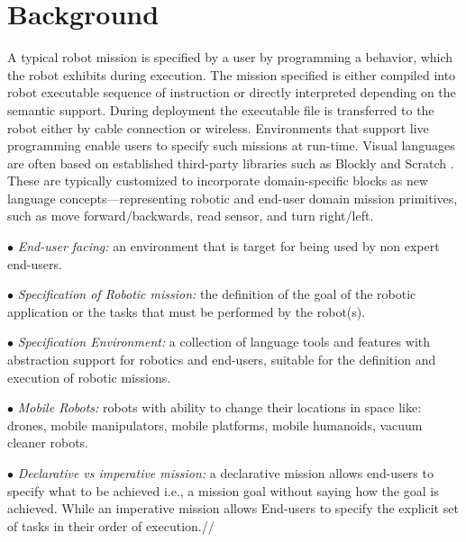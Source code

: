 \section{Background}
A typical robot mission is specified by a user by programming a behavior, which the robot exhibits during execution. The mission specified is either compiled into robot executable sequence of instruction or directly interpreted depending on the semantic support. During deployment the executable file is transferred to the robot either by cable connection or wireless. Environments that support live programming enable users to specify such missions at run-time. Visual languages are often based on established third-party libraries such as Blockly \cite{blockly} and Scratch \cite{Kaucic2015}. These are typically customized to incorporate domain-specific blocks as new language concepts---representing robotic and end-user domain mission primitives, such as move forward/backwards, read sensor, and turn right/left.


$\bullet$ \emph{End-user facing:} an environment that is target for being used by non expert end-users. %

$\bullet$ \emph{Specification of Robotic mission:} the definition of the goal of the robotic application or the tasks that must be performed by the robot(s).

$\bullet$ \emph{Specification  Environment:} a collection of language tools and features with abstraction support for robotics and end-users, suitable for the definition and execution of robotic missions.

$\bullet$ \emph{Mobile Robots:} robots with ability to change  their locations in space like: drones, mobile manipulators, mobile platforms, mobile humanoids, vacuum cleaner robots.

$\bullet$ \emph{Declarative vs imperative mission:} a declarative mission allows end-users to specify what to be achieved i.e., a mission goal without saying how the goal is achieved. While an  imperative mission allows End-users to specify the explicit set of tasks in their order of execution.// %

